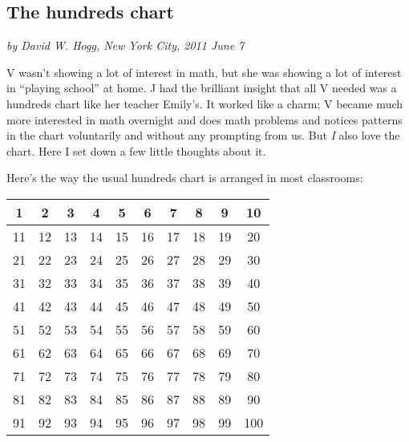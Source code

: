 \documentclass[12pt]{article}
\newcommand{\tablesize}{\footnotesize\sffamily}
\begin{document}
\subsection*{The hundreds chart}

\noindent
\textsl{by David W. Hogg, New York City, 2011 June 7}
\vspace{1ex}

V wasn't showing a lot of interest in math, but she was showing a lot
of interest in ``playing school'' at home.  J had the brilliant
insight that all V needed was a hundreds chart like her teacher
Emily's.  It worked like a charm; V became much more interested in
math overnight and does math problems and notices patterns in the
chart voluntarily and without any prompting from us.  But \emph{I}
also love the chart.  Here I set down a few little thoughts about it.

Here's the way the usual hundreds chart is arranged in most
classrooms:
\begin{center}\tablesize
\begin{tabular}{|c|c|c|c|c|c|c|c|c|c|}
\hline
  1 &  2 &  3 &  4 &  5 &  6 &  7 &  8 &  9 & 10 \\ \hline
 11 & 12 & 13 & 14 & 15 & 16 & 17 & 18 & 19 & 20 \\ \hline
 21 & 22 & 23 & 24 & 25 & 26 & 27 & 28 & 29 & 30 \\ \hline
 31 & 32 & 33 & 34 & 35 & 36 & 37 & 38 & 39 & 40 \\ \hline
 41 & 42 & 43 & 44 & 45 & 46 & 47 & 48 & 49 & 50 \\ \hline
 51 & 52 & 53 & 54 & 55 & 56 & 57 & 58 & 59 & 60 \\ \hline
 61 & 62 & 63 & 64 & 65 & 66 & 67 & 68 & 69 & 70 \\ \hline
 71 & 72 & 73 & 74 & 75 & 76 & 77 & 78 & 79 & 80 \\ \hline
 81 & 82 & 83 & 84 & 85 & 86 & 87 & 88 & 89 & 90 \\ \hline
 91 & 92 & 93 & 94 & 95 & 96 & 97 & 98 & 99 & 100 \\ \hline
\end{tabular}
\end{center}
\end{document}
